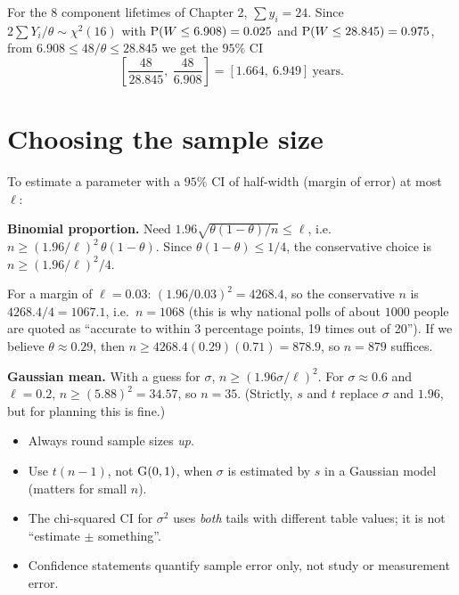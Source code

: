 \begin{example}
For the $8$ component lifetimes of Chapter 2, $\sum y_i = 24$. Since $2\sum Y_i/\theta\sim
\chi^2(16)$ with $\operatorname{P}(W\le 6.908) = 0.025$ and $\operatorname{P}(W\le 28.845) = 0.975$, from
$6.908\le 48/\theta\le 28.845$ we get the $95\%$ CI
\[
\left[\frac{48}{28.845},\ \frac{48}{6.908}\right] = [1.664,\ 6.949]\ \text{years}.
\]
\end{example}

\section{Choosing the sample size}

To estimate a parameter with a $95\%$ CI of half-width (margin of error) at most $\ell$:

\textbf{Binomial proportion.} Need $1.96\sqrt{\theta(1-\theta)/n}\le\ell$, i.e.\
$n\ge (1.96/\ell)^2\,\theta(1-\theta)$. Since $\theta(1-\theta)\le 1/4$, the conservative
choice is $n\ge (1.96/\ell)^2/4$.

\begin{example}
For a margin of $\ell=0.03$: $(1.96/0.03)^2 = 4268.4$, so the conservative $n$ is
$4268.4/4 = 1067.1$, i.e.\ $n=1068$ (this is why national polls of about $1000$ people
are quoted as ``accurate to within $3$ percentage points, 19 times out of 20''). If we
believe $\theta\approx 0.29$, then $n\ge 4268.4(0.29)(0.71) = 878.9$, so $n=879$ suffices.
\end{example}

\textbf{Gaussian mean.} With a guess for $\sigma$, $n\ge(1.96\sigma/\ell)^2$. For
$\sigma\approx0.6$ and $\ell=0.2$, $n\ge(5.88)^2 = 34.57$, so $n=35$. (Strictly, $s$ and
$t$ replace $\sigma$ and $1.96$, but for planning this is fine.)

\begin{important}
\begin{itemize}
  \item Always round sample sizes \emph{up}.
  \item Use $t(n-1)$, not $\operatorname{G}(0,1)$, when $\sigma$ is estimated by $s$ in a Gaussian
        model (matters for small $n$).
  \item The chi-squared CI for $\sigma^2$ uses \emph{both} tails with different table
        values; it is not ``estimate $\pm$ something''.
  \item Confidence statements quantify sample error only, not study or measurement error.
\end{itemize}
\end{important}

